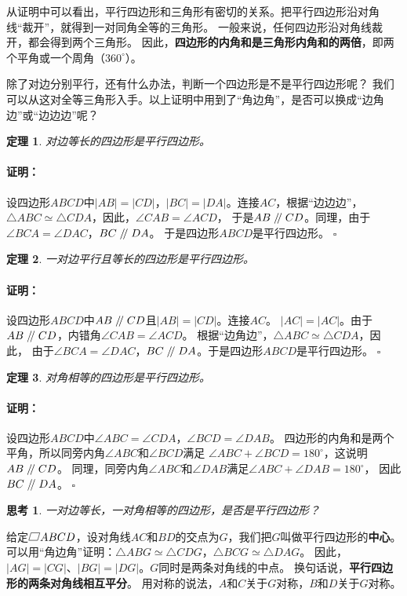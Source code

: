\documentclass[12pt,UTF8]{ctexbook}
\newtheorem{tm}{定理}[section]
\newtheorem{sk}{思考}[section]
\newenvironment{proof2}{\paragraph{\textbf{证明：}}}{\hfill$\square$}
\renewcommand\parallel{\mathrel{/\mskip-4mu/}}
\newcommand\parasbx{%
    \mathord{\text{%
        \tikz[baseline] \draw (0,.1ex) -- (.8em,.1ex) -- (1em,1.6ex) -- (.2em,1.6ex) -- cycle;}}}
\begin{document}
从证明中可以看出，平行四边形和三角形有密切的关系。把平行四边形沿对角线“裁开”，就得到一对同角全等的三角形。
一般来说，任何四边形沿对角线裁开，都会得到两个三角形。
因此，\textbf{四边形的内角和是三角形内角和的两倍}，即两个平角或一个周角（$360^\circ$）。

除了对边分别平行，还有什么办法，判断一个四边形是不是平行四边形呢？
我们可以从这对全等三角形入手。以上证明中用到了“角边角”，是否可以换成“边角边”或“边边边”呢？

\begin{tm}\label{tm:0-0-1}
    对边等长的四边形是平行四边形。
\end{tm}
\begin{proof2}
    设四边形$ABCD$中$|AB| = |CD|$，$|BC| = |DA|$。连接$AC$，根据“边边边”，
    $\triangle ABC \simeq \triangle CDA$，因此，$\angle CAB = \angle ACD$，
    于是$AB \parallel CD$。同理，由于$\angle BCA = \angle DAC$，$BC \parallel DA$。
    于是四边形$ABCD$是平行四边形。
\end{proof2}

\begin{tm}\label{tm:0-0-2}
    一对边平行且等长的四边形是平行四边形。
\end{tm}
\begin{proof2}
    设四边形$ABCD$中$AB \parallel CD$且$|AB| = |CD|$。连接$AC$。
    $|AC| = |AC|$。由于$AB \parallel CD$，内错角$\angle CAB = \angle ACD$。
    根据“边角边”，$\triangle ABC \simeq \triangle CDA$，因此，
    由于$\angle BCA = \angle DAC$，$BC \parallel DA$。于是四边形$ABCD$是平行四边形。
\end{proof2}

\begin{tm}\label{tm:0-0-3}
    对角相等的四边形是平行四边形。
\end{tm}
\begin{proof2}
    设四边形$ABCD$中$\angle ABC = \angle CDA$，$\angle BCD = \angle DAB$。
    四边形的内角和是两个平角，所以同旁内角$\angle ABC$和$\angle BCD$满足
    $\angle ABC + \angle BCD = 180^\circ$，这说明$AB \parallel CD$。
    同理，同旁内角$\angle ABC$和$\angle DAB$满足$\angle ABC + \angle DAB = 180^\circ$，
    因此$BC \parallel DA$。
\end{proof2}

\begin{sk}\label{sk:0-0-0}
    一对边等长，一对角相等的四边形，是否是平行四边形？
\end{sk}

给定$\parasbx ABCD$，设对角线$AC$和$BD$的交点为$G$，我们把$G$叫做平行四边形的\textbf{中心}。
可以用“角边角”证明：$\triangle ABG \simeq \triangle CDG$，$\triangle BCG \simeq \triangle DAG$。
因此，$|AG| = |CG|$、$|BG| = |DG|$。$G$同时是两条对角线的中点。
换句话说，\textbf{平行四边形的两条对角线相互平分}。
用对称的说法，$A$和$C$关于$G$对称，$B$和$D$关于$G$对称。
\end{document}
